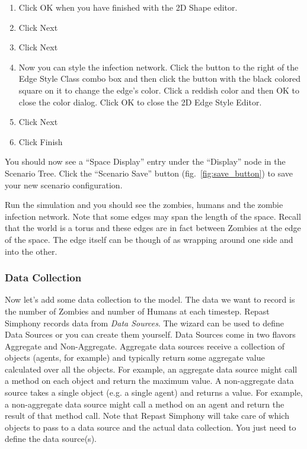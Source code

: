 \documentclass[11pt]{amsart}
\begin{document}
\begin{enumerate}
\item Click OK when you have finished with the 2D Shape editor.
\item Click Next
\item Click Next
\item Now you can style the infection network. Click the button to the right of the Edge Style Class combo box and then click the button with the black colored square on it to change the edge's color. Click a reddish color and then OK to close the color dialog. Click OK to close the 2D Edge Style Editor.
\item Click Next
\item Click Finish
\end{enumerate}
\vspace{.2in}

You should now see a ``Space Display'' entry under the ``Display'' node in the Scenario Tree. Click the ``Scenario Save''  button (fig.~\ref{fig:save_button}) to save your new scenario configuration.

Run the simulation and you should see the zombies, humans and the zombie infection network. Note that some edges may span the length of the space. Recall that the world is a torus and these edges are in fact between Zombies at the edge of the space. The edge itself can be though of as wrapping  around one side and into the other.

\subsubsection{Data Collection}
Now let's add some data collection to the model. The data we want to record is the number of Zombies and number of Humans at each timestep. Repast Simphony records data from \textit{Data Sources}. The wizard can be used to define Data Sources or you can create them yourself. Data Sources come in two flavors Aggregate and Non-Aggregate. Aggregate data sources receive a collection of objects (agents, for example) and typically return some aggregate value calculated over all the objects. For example, an aggregate data source might call a method on each object and return the maximum value. A non-aggregate data source takes a single object (e.g. a single agent) and returns a value. For example, a non-aggregate data source might call a method on an agent and return the result of that method call. Note that Repast Simphony will take care of which objects to pass to a data source and the actual data collection. You just need to define the data source(s). 
\end{document}
